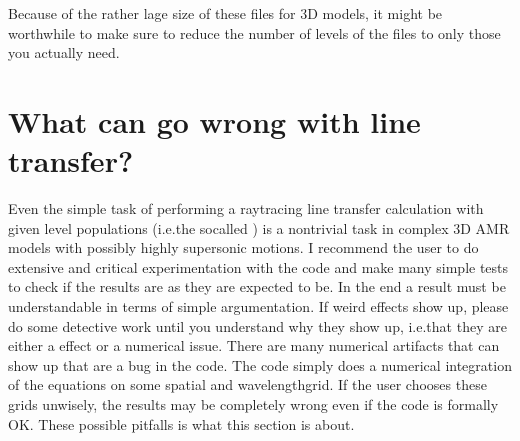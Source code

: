 \documentclass[letterpaper,10pt,english]{sphinxmanual}
\begin{document}
Because of the rather lage size of these files for 3\sphinxhyphen{}D models, it might be
worthwhile to make sure to reduce the number of levels of the
 files to only those you actually need.


\section{What can go wrong with line transfer?}
\label{\detokenize{lineradtrans:what-can-go-wrong-with-line-transfer}}\label{\detokenize{lineradtrans:sec-lines-pitfalls}}
Even the simple task of performing a ray\sphinxhyphen{}tracing line transfer calculation
with given level populations (i.e.the so\sphinxhyphen{}called ) is a non\sphinxhyphen{}trivial task in complex 3\sphinxhyphen{}D AMR models with possibly
highly supersonic motions. I recommend the user to do extensive and critical
experimentation with the code and make many simple tests to check if the
results are as they are expected to be. In the end a result must be
understandable in terms of simple argumentation. If weird effects show up,
please do some detective work until you understand why they show up, i.e.that they are either a  effect or a numerical issue. There are
many numerical artifacts that can show up that are  a bug in the
code. The code simply does a numerical integration of the equations on some
spatial\sphinxhyphen{} and wavelength\sphinxhyphen{}grid. If the user chooses these grids unwisely, the
results may be completely wrong even if the code is formally OK. These
possible pitfalls is what this section is about.
\end{document}
